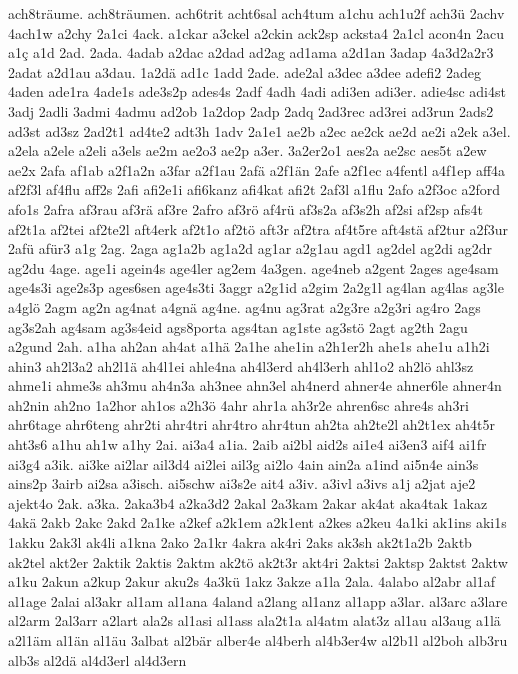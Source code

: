 {ach8träume.
ach8träumen.
ach6trit
acht6sal
ach4tum
a1chu
ach1u2f
ach3ü
2achv
4ach1w
a2chy
2a1ci
4ack.
a1ckar
a3ckel
a2ckin
ack2sp
acksta4
2a1cl
acon4n
2acu
a1ç
a1d
2ad.
2ada.
4adab
a2dac
a2dad
ad2ag
ad1ama
a2d1an
3adap
4a3d2a2r3
2adat
a2d1au
a3dau.
1a2dä
ad1c
1add
2ade.
ade2al
a3dec
a3dee
adefi2
2adeg
4aden
ade1ra
4ade1s
ade3s2p
ades4s
2adf
4adh
4adi
adi3en
adi3er.
adie4sc
adi4st
3adj
2adli
3admi
4admu
ad2ob
1a2dop
2adp
2adq
2ad3rec
ad3rei
ad3run
2ads2
ad3st
ad3sz
2ad2t1
ad4te2
adt3h
1adv
2a1e1
ae2b
a2ec
ae2ck
ae2d
ae2i
a2ek
a3el.
a2ela
a2ele
a2eli
a3els
ae2m
ae2o3
ae2p
a3er.
3a2er2o1
aes2a
ae2sc
aes5t
a2ew
ae2x
2afa
af1ab
a2f1a2n
a3far
a2f1au
2afä
a2f1än
2afe
a2f1ec
a4fentl
a4f1ep
aff4a
af2f3l
af4flu
aff2s
2afi
afi2e1i
afi6kanz
afi4kat
afi2t
2af3l
a1flu
2afo
a2f3oc
a2ford
afo1s
2afra
af3rau
af3rä
af3re
2afro
af3rö
af4rü
af3s2a
af3s2h
af2si
af2sp
afs4t
af2t1a
af2tei
af2te2l
aft4erk
af2t1o
af2tö
aft3r
af2tra
af4t5re
aft4stä
af2tur
a2f3ur
2afü
afür3
a1g
2ag.
2aga
ag1a2b
ag1a2d
ag1ar
a2g1au
agd1
ag2del
ag2di
ag2dr
ag2du
4age.
age1i
agein4s
age4ler
ag2em
4a3gen.
age4neb
a2gent
2ages
age4sam
age4s3i
age2s3p
ages6sen
age4s3ti
3aggr
a2g1id
a2gim
2a2g1l
ag4lan
ag4las
ag3le
a4glö
2agm
ag2n
ag4nat
a4gnä
ag4ne.
ag4nu
ag3rat
a2g3re
a2g3ri
ag4ro
2ags
ag3s2ah
ag4sam
ag3s4eid
ags8porta
ags4tan
ag1ste
ag3stö
2agt
ag2th
2agu
a2gund
2ah.
a1ha
ah2an
ah4at
a1hä
2a1he
ahe1in
a2h1er2h
ahe1s
ahe1u
a1h2i
ahin3
ah2l3a2
ah2l1ä
ah4l1ei
ahle4na
ah4l3erd
ah4l3erh
ahl1o2
ah2lö
ahl3sz
ahme1i
ahme3s
ah3mu
ah4n3a
ah3nee
ahn3el
ah4nerd
ahner4e
ahner6le
ahner4n
ah2nin
ah2no
1a2hor
ah1os
a2h3ö
4ahr
ahr1a
ah3r2e
ahren6sc
ahre4s
ah3ri
ahr6tage
ahr6teng
ahr2ti
ahr4tri
ahr4tro
ahr4tun
ah2ta
ah2te2l
ah2t1ex
ah4t5r
aht3s6
a1hu
ah1w
a1hy
2ai.
ai3a4
a1ia.
2aib
ai2bl
aid2s
ai1e4
ai3en3
aif4
ai1fr
ai3g4
a3ik.
ai3ke
ai2lar
ail3d4
ai2lei
ail3g
ai2lo
4ain
ain2a
a1ind
ai5n4e
ain3s
ains2p
3airb
ai2sa
a3isch.
ai5schw
ai3s2e
ait4
a3iv.
a3ivl
a3ivs
a1j
a2jat
aje2
ajekt4o
2ak.
a3ka.
2aka3b4
a2ka3d2
2akal
2a3kam
2akar
ak4at
aka4tak
1akaz
4akä
2akb
2akc
2akd
2a1ke
a2kef
a2k1em
a2k1ent
a2kes
a2keu
4a1ki
ak1ins
aki1s
1akku
2ak3l
ak4li
a1kna
2ako
2a1kr
4akra
ak4ri
2aks
ak3sh
ak2t1a2b
2aktb
ak2tel
akt2er
2aktik
2aktis
2aktm
ak2tö
ak2t3r
akt4ri
2aktsi
2aktsp
2aktst
2aktw
a1ku
2akun
a2kup
2akur
aku2s
4a3kü
1akz
3akze
a1la
2ala.
4alabo
al2abr
al1af
al1age
2alai
al3akr
al1am
al1ana
4aland
a2lang
al1anz
al1app
a3lar.
al3arc
a3lare
al2arm
2al3arr
a2lart
ala2s
al1asi
al1ass
ala2t1a
al4atm
alat3z
al1au
al3aug
a1lä
a2l1äm
al1än
al1äu
3albat
al2bär
alber4e
al4berh
al4b3er4w
al2b1l
al2boh
alb3ru
alb3s
al2dä
al4d3erl
al4d3ern
}
